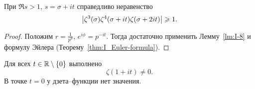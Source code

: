 \begin{nlemma}
\label{lm:I-9}
    При $\Re{s} > 1$, $s = \sigma + it$ справедливо неравенство
    \[
        \left| \zeta^3(\sigma)\zeta^4(\sigma+it)\zeta(\sigma+2it) \right| \geqslant 1.
    \]
\end{nlemma}
\begin{proof}
    Положим $r = \frac{1}{p^{\sigma}}$, $e^{i\phi} = p^{-it}$. Тогда достаточно применить Лемму~\ref{lm:I-8} и формулу Эйлера (Теорему~\ref{thm:I_Euler-formula}).
\end{proof}

\begin{ntheorem}
\label{thm:I-6}
    Для всех $t \in \mathbb{R} \setminus \{0\}$ выполнено
    \[
        \zeta(1 + it) \ne 0.
    \]
    В точке $t = 0$ у дзета--функции нет значения.
\end{ntheorem}
